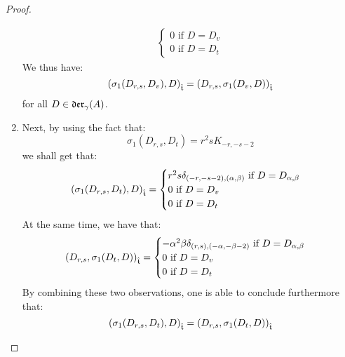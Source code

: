 \begin{proof}
\begin{enumerate}
$$\begin{aligned}
\begin{cases}
                                    \text{$0$ if $D = D_v$}
                                    \\
                                    \text{$0$ if $D = D_t$}
                                \end{cases}
                            \end{aligned}
                        $$
                    We thus have:
                        $$\left( \sigma_1(D_{r, s}, D_v), D \right)_{\hat{\mathfrak{t}}} = \left( D_{r, s}, \sigma_1(D_v, D) \right)_{\hat{\mathfrak{t}}}$$
                    for all $D \in \mathfrak{der}_{\gamma}(A)$.
                    \item Next, by using the fact that:
                        $$\sigma_1(D_{r, s}, D_t) = r^2 s K_{-r, -s - 2}$$
                    we shall get that:
                        $$
                            \left( \sigma_1(D_{r, s}, D_t), D \right)_{\hat{\mathfrak{t}}} =
                            \begin{cases}
                                \text{$r^2 s \delta_{(-r, -s - 2), (\alpha, \beta)}$ if $D = D_{\alpha, \beta}$}
                                \\
                                \text{$0$ if $D = D_v$}
                                \\
                                \text{$0$ if $D = D_t$}
                            \end{cases}
                        $$
                    At the same time, we have that:
                        $$
                            \begin{aligned}
                                \left( D_{r, s}, \sigma_1(D_t, D) \right)_{\hat{\mathfrak{t}}} =
                                \begin{cases}
                                    \text{$-\alpha^2 \beta \delta_{(r, s), (-\alpha, -\beta - 2)}$ if $D = D_{\alpha, \beta}$}
                                    \\
                                    \text{$0$ if $D = D_v$}
                                    \\
                                    \text{$0$ if $D = D_t$}
                                \end{cases}
                            \end{aligned}
                        $$
                    By combining these two observations, one is able to conclude furthermore that:
                        $$\left( \sigma_1(D_{r, s}, D_t), D \right)_{\hat{\mathfrak{t}}} = \left( D_{r, s}, \sigma_1(D_t, D) \right)_{\hat{\mathfrak{t}}}$$

\end{enumerate}
\end{proof}

